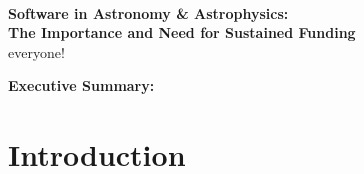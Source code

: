 \documentclass[11pt]{article}
\begin{document}
\thispagestyle{plain}

\mbox{ }\vspace{-0.7in}

\begin{center}
{\Large \sffamily \bfseries Software in Astronomy \& Astrophysics:\\The Importance and Need for Sustained Funding} \\
{
everyone!
}
\end{center}

\begin{tcolorbox}
{\sffamily \bfseries Executive Summary:} 
\end{tcolorbox}

\section{Introduction}
\end{document}
